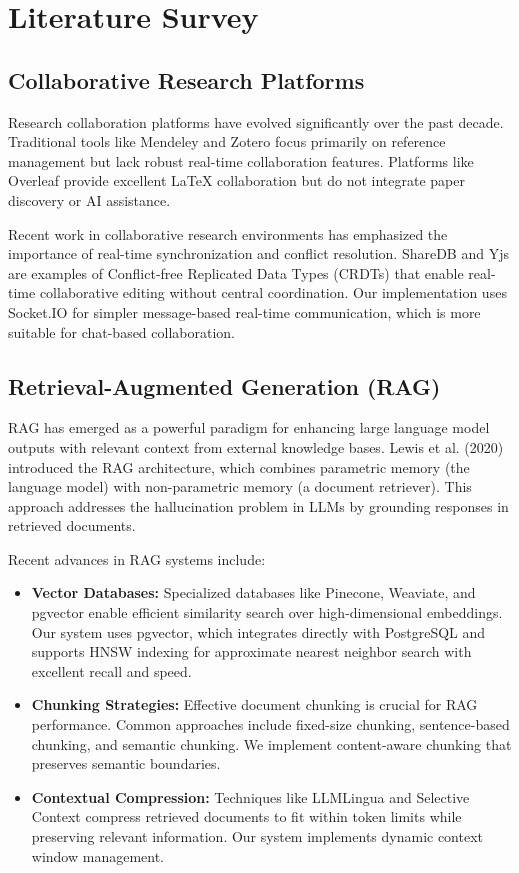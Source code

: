 \documentclass[12pt]{report}
\begin{document}
\section{Literature Survey}

\subsection{Collaborative Research Platforms}

Research collaboration platforms have evolved significantly over the past decade. Traditional tools like Mendeley \cite{bibitem1} and Zotero focus primarily on reference management but lack robust real-time collaboration features. Platforms like Overleaf provide excellent LaTeX collaboration but do not integrate paper discovery or AI assistance.

Recent work in collaborative research environments has emphasized the importance of real-time synchronization and conflict resolution. ShareDB and Yjs are examples of Conflict-free Replicated Data Types (CRDTs) that enable real-time collaborative editing without central coordination. Our implementation uses Socket.IO for simpler message-based real-time communication, which is more suitable for chat-based collaboration.

\subsection{Retrieval-Augmented Generation (RAG)}

RAG has emerged as a powerful paradigm for enhancing large language model outputs with relevant context from external knowledge bases. Lewis et al. (2020) introduced the RAG architecture, which combines parametric memory (the language model) with non-parametric memory (a document retriever). This approach addresses the hallucination problem in LLMs by grounding responses in retrieved documents.

Recent advances in RAG systems include:
\begin{itemize}
    \item \textbf{Vector Databases:} Specialized databases like Pinecone, Weaviate, and pgvector enable efficient similarity search over high-dimensional embeddings. Our system uses pgvector, which integrates directly with PostgreSQL and supports HNSW indexing for approximate nearest neighbor search with excellent recall and speed.
    
    \item \textbf{Chunking Strategies:} Effective document chunking is crucial for RAG performance. Common approaches include fixed-size chunking, sentence-based chunking, and semantic chunking. We implement content-aware chunking that preserves semantic boundaries.
    
    \item \textbf{Contextual Compression:} Techniques like LLMLingua and Selective Context compress retrieved documents to fit within token limits while preserving relevant information. Our system implements dynamic context window management.
\end{itemize}
\end{document}
